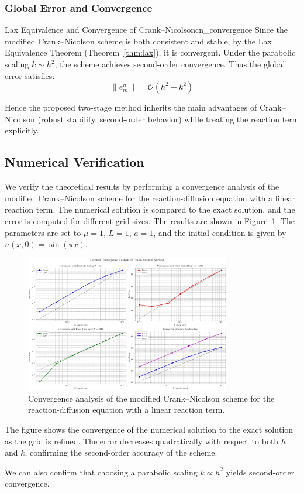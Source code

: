 \subsubsection{Global Error and Convergence}

\begin{theorem}{Lax Equivalence and Convergence of Crank--Nicolson}{cn_convergence}
  Since the modified Crank--Nicolson scheme is both consistent and stable, by the Lax Equivalence Theorem
  (Theorem~\ref{thm:lax}), it is convergent. Under the parabolic scaling $k \sim h^2$, the scheme achieves
  second-order convergence. Thus the global error satisfies:
  \[
    \|e_m^n\| = \mathcal{O}\!\left(h^2 + k^2\right)
  \]

\end{theorem}

Hence the proposed two-stage method inherits the main advantages of Crank--Nicolson (robust stability, second-order behavior) while treating the reaction term explicitly.

\subsection{Numerical Verification}
We verify the theoretical results by performing a convergence analysis of the modified Crank--Nicolson scheme for the reaction-diffusion equation with a linear reaction term. The numerical solution is compared to the exact solution, and the error is computed for different grid sizes. The results are shown in Figure~\ref{fig:convergence_analysis_2d}.
The parameters are set to \(\mu = 1\), \(L = 1\), \(a = 1\), and the initial condition is given by \(u(x,0) = \sin(\pi x)\).

\begin{figure}[H]
  \centering
  \includegraphics[width=0.8\textwidth]{figures/convergence_analysis_2d.png}
  \caption{Convergence analysis of the modified Crank--Nicolson scheme for the reaction-diffusion equation with a linear reaction term.}
  \label{fig:convergence_analysis_2d}
\end{figure}

The figure shows the convergence of the numerical solution to the exact solution as the grid is refined. The error decreases quadratically with respect to both \(h\) and \(k\), confirming the second-order accuracy of the scheme.

We can also confirm that choosing a parabolic scaling \(k \propto h^2\) yields second-order convergence.


